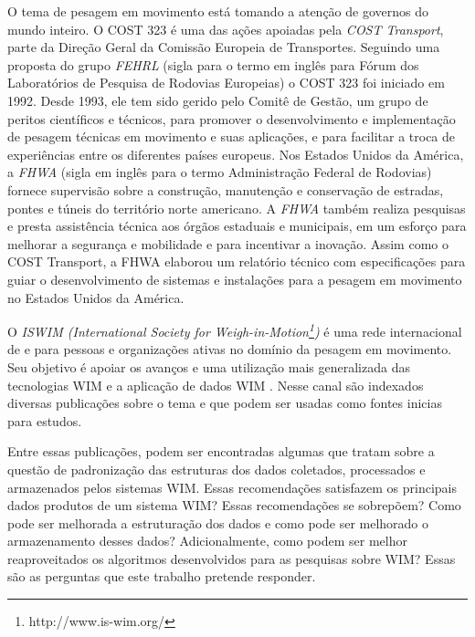 \documentclass{ufscThesis}
\begin{document}
O tema de pesagem em movimento está tomando a atenção de governos do mundo inteiro. O COST 323 é uma das ações apoiadas pela \textit{COST Transport}, parte da Direção Geral da Comissão Europeia de Transportes. Seguindo uma proposta do grupo \textit{FEHRL} (sigla para o termo em inglês para Fórum dos Laboratórios de Pesquisa de Rodovias Europeias) o COST 323 foi iniciado em 1992. Desde 1993, ele tem sido gerido pelo Comitê de Gestão, um grupo de peritos científicos e técnicos, para promover o desenvolvimento e implementação de pesagem técnicas em movimento e suas aplicações, e para facilitar a troca de experiências entre os diferentes países europeus. Nos Estados Unidos da América, a \textit{FHWA} (sigla em inglês para o termo Administração Federal de Rodovias) fornece supervisão sobre a construção, manutenção e conservação de estradas, pontes e túneis do território norte americano. A \textit{FHWA} também realiza pesquisas e presta assistência técnica aos órgãos estaduais e municipais, em um esforço para melhorar a segurança e mobilidade e para incentivar a inovação. Assim como o COST Transport, a FHWA elaborou um relatório técnico \cite{tech:fhwa-wim-data-analysts-manual} com especificações para guiar o desenvolvimento de sistemas e instalações para a pesagem em movimento no Estados Unidos da América.


O \textit{ISWIM (International Society for Weigh-in-Motion\footnote{http://www.is-wim.org/})} é uma rede internacional de e para pessoas e organizações ativas no domínio da pesagem em movimento. Seu objetivo é apoiar os avanços e uma utilização mais generalizada das tecnologias WIM e a aplicação de dados WIM . Nesse canal são indexados diversas publicações sobre o tema e que podem ser usadas como fontes inicias para estudos.

Entre essas publicações, podem ser encontradas algumas que tratam sobre a questão de padronização das estruturas dos dados coletados, processados e armazenados pelos sistemas WIM. Essas recomendações satisfazem os principais dados produtos de um sistema WIM? Essas recomendações se sobrepõem? Como pode ser melhorada a estruturação dos dados e como pode ser melhorado o armazenamento desses dados? Adicionalmente, como podem ser melhor reaproveitados os algoritmos desenvolvidos para as pesquisas sobre WIM? Essas são as perguntas que este trabalho pretende responder.
\end{document}
